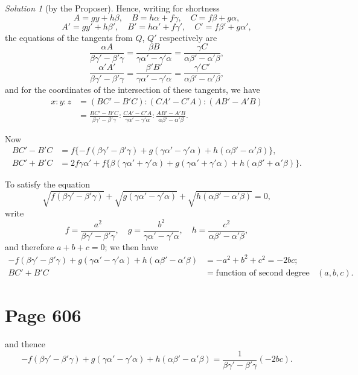 \documentclass[12pt,a4paper]{article}
\theoremstyle{plain}
\theoremstyle{definition}
\theoremstyle{remark}
\newtheorem*{solution}{Solution}
\begin{document}
\begin{solution}[by the Proposer]
Hence, writing for shortness
\[
A = gy + h\beta, \quad B = h\alpha + f\gamma, \quad C = f\beta + g\alpha,
\]
\[
A' = gy' + h\beta', \quad B' = h\alpha' + f\gamma', \quad C' = f\beta' + g\alpha',
\]
the equations of the tangents from $Q$, $Q'$ respectively are
\[
\frac{\alpha A}{\beta\gamma' - \beta'\gamma} =
\frac{\beta B}{\gamma\alpha' - \gamma'\alpha} =
\frac{\gamma C}{\alpha\beta' - \alpha'\beta},
\]
\[
\frac{\alpha' A'}{\beta\gamma' - \beta'\gamma} =
\frac{\beta' B'}{\gamma\alpha' - \gamma'\alpha} =
\frac{\gamma' C'}{\alpha\beta' - \alpha'\beta},
\]
and for the coordinates of the intersection of these tangents, we have
\begin{align*}
x : y : z &= (BC' - B'C) : (CA' - C'A) : (AB' - A'B) \\
&= \frac{BC' - B'C}{\beta\gamma' - \beta'\gamma} :
\frac{CA' - C'A}{\gamma\alpha' - \gamma'\alpha} :
\frac{AB' - A'B}{\alpha\beta' - \alpha'\beta}.
\end{align*}

Now
\begin{align*}
BC' - B'C &= f\{-f(\beta\gamma' - \beta'\gamma) + g(\gamma\alpha' - \gamma'\alpha) + h(\alpha\beta' - \alpha'\beta)\},\\
BC' + B'C &= 2f\gamma\alpha' + f\{\beta(\gamma\alpha' + \gamma'\alpha) + g(\gamma\alpha' + \gamma'\alpha) + h(\alpha\beta' + \alpha'\beta)\}.
\end{align*}

To satisfy the equation
\[
\sqrt{f(\beta\gamma' - \beta'\gamma)} + \sqrt{g(\gamma\alpha' - \gamma'\alpha)} + \sqrt{h(\alpha\beta' - \alpha'\beta)} = 0,
\]
write
\[
f = \frac{a^2}{\beta\gamma' - \beta'\gamma}, \quad
 g = \frac{b^2}{\gamma\alpha' - \gamma'\alpha}, \quad
 h = \frac{c^2}{\alpha\beta' - \alpha'\beta},
\]
and therefore $a + b + c = 0$; we then have
\begin{align*}
-f(\beta\gamma' - \beta'\gamma) + g(\gamma\alpha' - \gamma'\alpha) + h(\alpha\beta' - \alpha'\beta) &= -a^2 + b^2 + c^2 = -2bc;\\
BC' + B'C &= \text{function of second degree in } (a, b, c).
\end{align*}

\section*{Page 606}
\setcounter{page}{606}

and thence
\[
-f(\beta\gamma' - \beta'\gamma) + g(\gamma\alpha' - \gamma'\alpha) + h(\alpha\beta' - \alpha'\beta) = \frac{1}{\beta\gamma' - \beta'\gamma}(-2bc).
\]


\end{solution}
\end{document}

